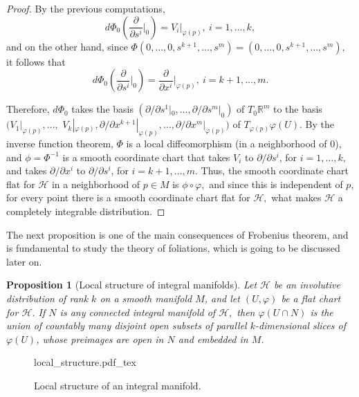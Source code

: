 \documentclass[12pt, letterpaper, reqno]{amsart}
\newcommand{\incfig}[2][1]{%
    \def\svgwidth{#1\columnwidth}
    {#2.pdf_tex}
}
\theoremstyle{definition}
\theoremstyle{plain}
\newtheorem{prop}{Proposition}
\theoremstyle{remark}
\begin{document}
\begin{proof}
	By the previous computations, $$ d\Phi_0\left( \frac{\partial}{\partial s^i}\Big|_{0} \right) = V_i |_{\varphi(p)}, \ i=1,\dots,k, $$ and on the other hand, since $ \Phi(0,\dots,0,s^{k+1},\dots,s^m)=(0,\dots,0,s^{k+1},\dots,s^m), $ it follows that
	$$ d\Phi_0 \left( \frac{\partial}{\partial s^i}\Big|_{0}  \right) = \frac{\partial}{\partial x^i}\Big|_{\varphi(p)},\ i=k+1,\dots,m.  $$ 
	
	Therefore, $ d\Phi_0 $ takes the basis $ \left( \partial/\partial s^1 |_0,\dots,\partial/\partial s^m |_0 \right) $ of $ T_0 \mathbb{R}^m $ to the basis $ ( V_1|_{\varphi(p)},  \dots,$ $ V_k|_{\varphi(p)}, \partial/\partial x^{k+1}|_{\varphi(p)}, \dots, \partial/\partial x^{m}|_{\varphi(p)}) $ of $ T_{\varphi(p)} \varphi(U). $ By the inverse function theorem, $ \Phi $ is a local diffeomorphism (in a neighborhood of $ 0 $), and $ \phi=\Phi^{-1} $ is a smooth coordinate chart that takes $ V_i $ to $ \partial/\partial s^i $, for $ i=1,\dots,k, $ and takes $ \partial / \partial x^{i} $ to $ \partial/\partial s^i $, for $ i=k+1,\dots,m. $ Thus, the smooth coordinate chart flat for $ \mathcal{H} $ in a neighborhood of $ p\in M $ is $ \phi\circ\varphi, $ and since this is independent of $ p $, for every point there is a smooth coordinate chart flat for $ \mathcal{H}, $ what makes $ \mathcal{H} $ a completely integrable distribution.

\end{proof}

The next proposition is one of the main consequences of Frobenius theorem, and is fundamental to study the theory of foliations, which is going to be discussed later on.
\begin{prop}[Local structure of integral manifolds]\label{prop:local_structure}
	Let $ \mathcal{H} $ be an involutive distribution of rank $ k $ on a smooth manifold $ M $, and let $ (U,\varphi) $ be a flat chart for $ \mathcal{H} $. If $ N $ is any connected integral manifold of $ \mathcal{H}, $ then $ \varphi(U\cap N) $ is the union of countably many disjoint open subsets of parallel $ k $-dimensional slices of $ \varphi(U) $, whose preimages are open in $ N $ and embedded in $ M $.
\end{prop}

\begin{figure}
    \centering
    \incfig{local_structure}
    \caption{Local structure of an integral manifold.}
    \label{fig:local_structure}
\end{figure}
\end{document}
